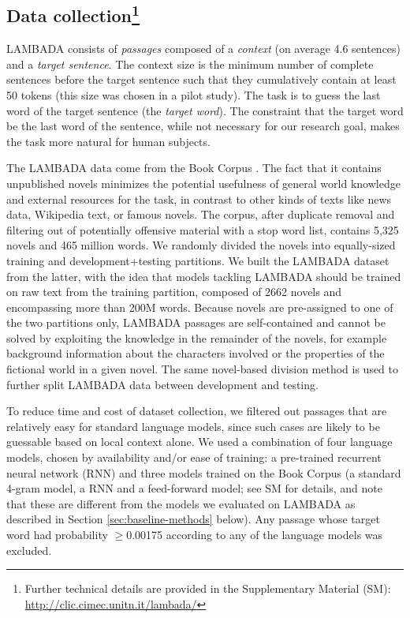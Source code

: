 \subsection{Data collection\footnote{Further technical details are provided in the Supplementary Material (SM): \url{http://clic.cimec.unitn.it/lambada/}}}
\label{sec:data-coll-meth}

LAMBADA consists of \emph{passages} composed of a \emph{context} (on average 4.6 sentences) and a
\emph{target sentence}. The context size is the minimum number of complete sentences before the target sentence such that they cumulatively contain at least 50 tokens (this size was chosen in a pilot study). The task is to guess the last word of the target sentence (the \emph{target word}). The constraint that the target word be the last word of the sentence, while not necessary for our research goal, makes the task more natural for human subjects.

The LAMBADA data come from the Book Corpus \cite{zhu15}. The fact that it contains unpublished novels minimizes the potential usefulness of general world knowledge and external resources for the task, in contrast to other kinds of texts like news data, Wikipedia text, or famous novels. The corpus, after duplicate removal and filtering out of potentially offensive material with a stop word list, contains 5,325 novels and 465 million words. We randomly divided the novels into equally-sized training and development+testing partitions. We built the LAMBADA dataset from the latter, with the idea that models tackling LAMBADA should be trained on raw text from the training partition, composed of 2662 novels and encompassing more than 200M words. Because novels are pre-assigned to one of the two partitions only, LAMBADA passages are self-contained and cannot be solved by exploiting the knowledge in the remainder of the novels, for example background information about the characters involved or the properties of the fictional world in a given novel. The same novel-based division method is used to further split LAMBADA data between development and testing.

To reduce time and cost of dataset collection, we filtered out passages that are relatively easy for standard language models, since such cases are likely to be guessable based on local context alone. We used a combination of four language models, chosen by availability and/or ease of training: a pre-trained recurrent neural network (RNN) \cite{export:175562} and three models trained on the Book Corpus (a standard 4-gram model, a RNN and a feed-forward model; see SM for details, and note that these are different from the models we evaluated on LAMBADA as described in Section
\ref{sec:baseline-methods} below). Any passage whose target word had probability $\ge$0.00175 according to any of the language models was excluded.

